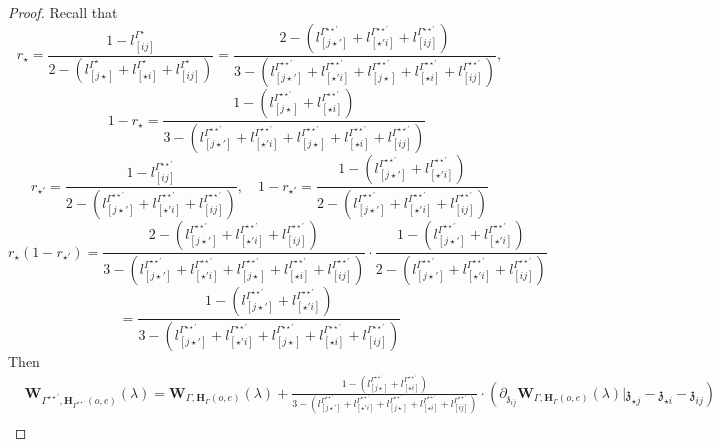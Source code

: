 \documentclass[11pt]{amsart}
\theoremstyle{definition}
\theoremstyle{remark}
\numberwithin{equation}{section}
\begin{document}
\begin{proof}
Recall that
$$
r_{\star}=\frac{1-l^{\Gamma^\star}_{[ ij]}}{2-(l^{\Gamma^\star}_{[ j\star]}+l^{\Gamma^\star}_{[ \star i]}+l^{\Gamma^\star}_{[ ij]})}=\frac{2-(l^{\Gamma^{\star\star'}}_{[ j\star']}+l^{\Gamma^{\star\star'}}_{[ \star 'i]}+l^{\Gamma^{\star\star'}}_{[ ij]})}{3-(l^{\Gamma^{\star\star'}}_{[ j\star']}+l^{\Gamma^{\star\star'}}_{[ \star 'i]}+l^{\Gamma^{\star\star'}}_{[ j\star]}+l^{\Gamma^{\star\star'}}_{[ \star i]}+l^{\Gamma^{\star\star'}}_{[ ij]})},
$$
$$
\quad 1-r_{\star}=\frac{1-(l^{\Gamma^{\star\star'}}_{[ j\star]}+l^{\Gamma^{\star\star'}}_{[ \star i]})}{3-(l^{\Gamma^{\star\star'}}_{[ j\star']}+l^{\Gamma^{\star\star'}}_{[ \star 'i]}+l^{\Gamma^{\star\star'}}_{[ j\star]}+l^{\Gamma^{\star\star'}}_{[ \star i]}+l^{\Gamma^{\star\star'}}_{[ ij]})}
$$
$$
r_{\star'}=\frac{1-l^{\Gamma^{\star\star'}}_{[ ij]}}{2-(l^{\Gamma^{\star\star'}}_{[ j\star']}+l^{\Gamma^{\star\star'}}_{[ \star' i]}+l^{\Gamma^{\star\star'}}_{[ ij]})},\quad 1-r_{\star'}=\frac{1-(l^{\Gamma^{\star\star'}}_{[ j\star']}+l^{\Gamma^{\star\star'}}_{[ \star' i]})}{2-(l^{\Gamma^{\star\star'}}_{[ j\star']}+l^{\Gamma^{\star\star'}}_{[ \star' i]}+l^{\Gamma^{\star\star'}}_{[ ij]})}
$$
$$
r_{\star}(1-r_{\star'})=\frac{2-(l^{\Gamma^{\star\star'}}_{[ j\star']}+l^{\Gamma^{\star\star'}}_{[ \star 'i]}+l^{\Gamma^{\star\star'}}_{[ ij]})}{3-(l^{\Gamma^{\star\star'}}_{[ j\star']}+l^{\Gamma^{\star\star'}}_{[ \star 'i]}+l^{\Gamma^{\star\star'}}_{[ j\star]}+l^{\Gamma^{\star\star'}}_{[ \star i]}+l^{\Gamma^{\star\star'}}_{[ ij]})}\cdot\frac{1-(l^{\Gamma^{\star\star'}}_{[ j\star']}+l^{\Gamma^{\star\star'}}_{[ \star' i]})}{2-(l^{\Gamma^{\star\star'}}_{[ j\star']}+l^{\Gamma^{\star\star'}}_{[ \star' i]}+l^{\Gamma^{\star\star'}}_{[ ij]})}
$$
$$=\frac{1-(l^{\Gamma^{\star\star'}}_{[ j\star']}+l^{\Gamma^{\star\star'}}_{[ \star 'i]})}{3-(l^{\Gamma^{\star\star'}}_{[ j\star']}+l^{\Gamma^{\star\star'}}_{[ \star 'i]}+l^{\Gamma^{\star\star'}}_{[ j\star]}+l^{\Gamma^{\star\star'}}_{[ \star i]}+l^{\Gamma^{\star\star'}}_{[ ij]})}
$$
\iffalse
  Then
  \begin{align*}
& \mathbf{W}_{\Gamma^{\star\star'},\mathbf{H}_{\Gamma^{\star\star'}}(o,e)}(\lambda)  =\mathbf{W}_{\Gamma,\mathbf{H}_{\Gamma}(o,e)}(\lambda)+\frac{1-(l^{\Gamma^{\star\star'}}_{[ j\star]}+l^{\Gamma^{\star\star'}}_{[ \star i]})}{3-(l^{\Gamma^{\star\star'}}_{[ j\star']}+l^{\Gamma^{\star\star'}}_{[ \star 'i]}+l^{\Gamma^{\star\star'}}_{[ j\star]}+l^{\Gamma^{\star\star'}}_{[ \star i]}+l^{\Gamma^{\star\star'}}_{[ ij]})}\cdot\left(\partial_{\mathfrak{z}_{ij}}\mathbf{W}_{\Gamma,\mathbf{H}_{\Gamma}(o,e)}(\lambda)|\mathfrak{z}_{\star j}-\mathfrak{z}_{\star i}-\mathfrak{z}_{ij}\right)\\

\end{align*}
\end{proof}
\end{document}
